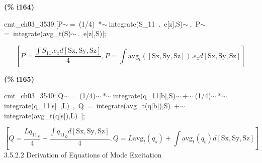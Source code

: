 \documentclass[fleqn]{article}
\begin{document}
\noindent
\begin{minipage}[t]{4.000000em}\color{red}\bfseries
(\% i164)	
\end{minipage}
\begin{minipage}[t]{\textwidth}\color{blue}
cmt\_ch03\_3539:[P\ensuremath{\sim\ }=\ (1/4)\ *\ensuremath{\sim\ }integrate(S\_11\ .\ e[z],S)\ensuremath{\sim\ },\ P\ensuremath{\sim\ }=\ integrate(avg\_t(S)\ensuremath{\sim\ }.\ e[z],S)];
\end{minipage}
\[\displaystyle \tag{cmt\_ ch03\_ 3539} 
\left[ P=\frac{\int {\left. {S_{\ensuremath{\mathrm{11}}}}\ensuremath{\mathrm{ . }}{e_z}d\left[ \ensuremath{\mathrm{Sx}}\operatorname{,}\ensuremath{\mathrm{Sy}}\operatorname{,}\ensuremath{\mathrm{Sz}}\right] \right.}}{4}\operatorname{,}P=\int {\left. {{\ensuremath{\mathrm{avg}}}_t}\left( \left[ \ensuremath{\mathrm{Sx}}\operatorname{,}\ensuremath{\mathrm{Sy}}\operatorname{,}\ensuremath{\mathrm{Sz}}\right] \right) \ensuremath{\mathrm{ . }}{e_z}d\left[ \ensuremath{\mathrm{Sx}}\operatorname{,}\ensuremath{\mathrm{Sy}}\operatorname{,}\ensuremath{\mathrm{Sz}}\right] \right.}\right] \mbox{}
\]


\noindent
\begin{minipage}[t]{4.000000em}\color{red}\bfseries
(\% i165)	
\end{minipage}
\begin{minipage}[t]{\textwidth}\color{blue}
cmt\_ch03\_3540:[Q\ensuremath{\sim\ }=\ (1/4)\ensuremath{\sim\ }*\ensuremath{\sim\ }integrate(q\_11[b],S)\ensuremath{\sim\ }+\ensuremath{\sim\ }(1/4)\ensuremath{\sim\ }*\ensuremath{\sim\ }integrate(q\_11[s]\ ,L)\ ,\ Q\ =\ integrate(avg\_t(q[b]),S)\ +\ensuremath{\sim\ }integrate(avg\_t(q[s]),L)\ ];
\end{minipage}
\[\displaystyle \tag{cmt\_ ch03\_ 3540} 
\left[ Q=\frac{L {{{q_{\ensuremath{\mathrm{11}}}}}_s}}{4}+\frac{\int {\left. {{{q_{\ensuremath{\mathrm{11}}}}}_b}d\left[ \ensuremath{\mathrm{Sx}}\operatorname{,}\ensuremath{\mathrm{Sy}}\operatorname{,}\ensuremath{\mathrm{Sz}}\right] \right.}}{4}\operatorname{,}Q=L {{\ensuremath{\mathrm{avg}}}_t}\left( {q_s}\right) +\int {\left. {{\ensuremath{\mathrm{avg}}}_t}\left( {q_b}\right) d\left[ \ensuremath{\mathrm{Sx}}\operatorname{,}\ensuremath{\mathrm{Sy}}\operatorname{,}\ensuremath{\mathrm{Sz}}\right] \right.}\right] \mbox{}
\]
3.5.2.2 Derivation of Equations of Mode Excitation
\end{document}
